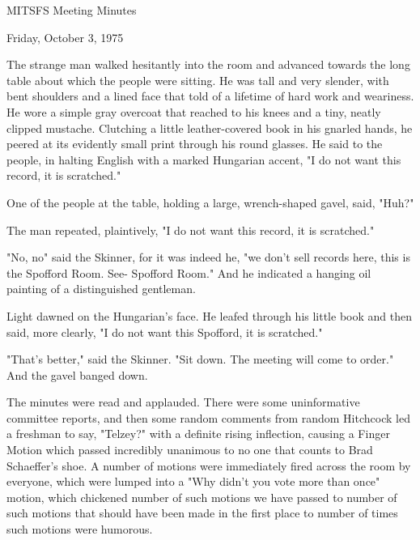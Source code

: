 \documentclass[12pt]{article}
\begin{document}
\begin{center}

MITSFS Meeting Minutes

Friday, October 3, 1975

\end{center}
 
\vspace{12pt}

\setlength{\parskip}{6pt}

\noindent
The strange man walked hesitantly into the room and advanced towards the long table about which the people were sitting. He was tall and very slender, with bent shoulders and a lined face that told of a lifetime of hard work and weariness. He wore a simple gray overcoat that reached to his knees and a tiny, neatly clipped mustache. Clutching a little leather-covered book in his gnarled hands, he peered at its evidently small print through his round glasses. He said to the people, in halting English with a marked Hungarian accent, "I do not want this record, it is scratched."

One of the people at the table, holding a large, wrench-shaped gavel, said, "Huh?"

The man repeated, plaintively, "I do not want this record, it is scratched."

"No, no" said the Skinner, for it was indeed he, "we don't sell records here, this is the Spofford Room. See- Spofford Room." And he indicated a hanging oil painting of a distinguished gentleman.

Light dawned on the Hungarian's face. He leafed through his little book and then said, more clearly, "I do not want this Spofford, it is scratched."

"That's better," said the Skinner. "Sit down. The meeting will come to order." And the gavel banged down.

The minutes were read and applauded. There were some uninformative committee reports, and then some random comments from random Hitchcock led a freshman to say, "Telzey?" with a definite rising inflection, causing a Finger Motion which passed incredibly unanimous to no one that counts to Brad Schaeffer's shoe. A number of motions were immediately fired across the room by everyone, which were lumped into a "Why didn't you vote more than once" motion, which chickened number of such motions we have passed to number of such motions that should have been made in the first place to number of times such motions were humorous.
\end{document}
